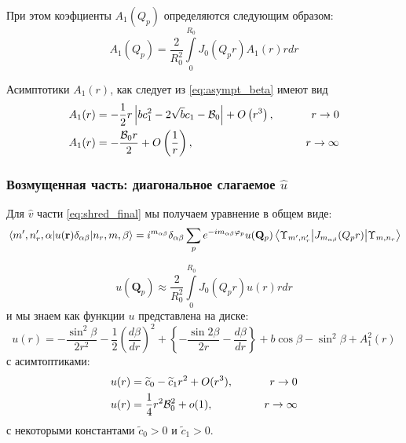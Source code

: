 \documentclass[a4paper,article,14pt]{extarticle}
\begin{document}
При этом коэфциенты $A_{1} (Q_p)$ определяются следующим образом:
\begin{equation}
A_{1} (Q_p) = \frac{2}{R_0^2}  \int\limits_{0}^{R_0}  J_{0} (Q_p r ) A_1(r) r dr 
\end{equation} 

Асимптотики $A_1(r)$, как следует из \eqref{eq:asympt_beta} имеют вид
\begin{equation}
\begin{aligned}
A_1(r) &= -\frac{1}{2} r \left|b c_1^2-2 \sqrt{b} c_1-{\cal{B}}_0\right|+O\left(r^3\right), \qquad &r \rightarrow 0 \\
A_1(r) &= -\frac{{\cal{B}}_0 r}{2}+O\left(\frac{1}{r}\right), \qquad &r \rightarrow \infty
\end{aligned}
\end{equation}
\subsubsection{Возмущенная часть: диагональное слагаемое $\hat u$}
Для  $\hat v$ части \eqref{eq:shred_final} мы получаем уравнение в общем виде:
\begin{equation}
\label{eq:final_u}
\mel{m', n'_r,\alpha} {u(\mathbf{r})  \delta_{\alpha \beta}}{n_r,m, \beta} = i^{m_{\alpha \beta} }  \delta_{\alpha \beta} \sum\limits_{p}      e^{- i m_{\alpha \beta} \varphi_p} u(\mathbf{Q}_p)\mel{\Upsilon_{m', n'_r}} {J_{m_{\alpha \beta}} (Q_p r) }{\Upsilon_{m, n_r}}
\end{equation}

\begin{equation}
u (\mathbf{Q}_p) \approx \frac{2}{R_0^2}  \int\limits_{0}^{R_0}  J_0 (Q_p r ) u(r) r dr 
\end{equation} 
и мы знаем как функции $u$ представлена на диске:
\begin{equation}
u(r) = -\frac{\sin^2 \beta }{2r^2} - \frac{1}{2}\left( \frac{d\beta }{dr} \right)^2 +  \left\{  - \frac{\sin 2\beta }{2r}  - \frac{d\beta }{dr} \right\} + b\cos \beta - \sin ^ 2 \beta + A^2_1(r)
\end{equation}
с асимтоптиками:
\begin{equation}
\begin{aligned}
u(r) &= \widetilde{c}_0 - \widetilde{c}_1 r^2 + O(r^3), \qquad &r \rightarrow 0 \\
u(r) &= \frac{1}{4} r^2 {\cal{B}}_0^2 + o(1), \qquad &r \rightarrow \infty
\end{aligned}
\end{equation}
с некоторыми константами $\widetilde{c}_0 > 0$ и $\widetilde{c}_1 > 0$.
\end{document}
